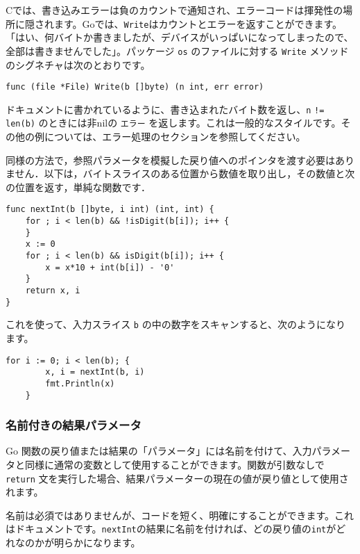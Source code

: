 \documentclass{jsarticle}
\begin{document}
Cでは、書き込みエラーは負のカウントで通知され、エラーコードは揮発性の場所に隠されます。Goでは、\texttt{Write}はカウントとエラーを返すことができます。「はい、何バイトか書きましたが、デバイスがいっぱいになってしまったので、全部は書きませんでした」。パッケージ
\texttt{os} のファイルに対する \texttt{Write}
メソッドのシグネチャは次のとおりです。

\begin{lstlisting}[numbers=none]
func (file *File) Write(b []byte) (n int, err error)
\end{lstlisting}

ドキュメントに書かれているように、書き込まれたバイト数を返し、\texttt{n}
\texttt{!=} \texttt{len(b)} のときには非nilの \texttt{エラー}
を返します。これは一般的なスタイルです。その他の例については、エラー処理のセクションを参照してください。

同様の方法で，参照パラメータを模擬した戻り値へのポインタを渡す必要はありません．以下は，バイトスライスのある位置から数値を取り出し，その数値と次の位置を返す，単純な関数です．

\begin{lstlisting}[numbers=none]
func nextInt(b []byte, i int) (int, int) {
    for ; i < len(b) && !isDigit(b[i]); i++ {
    }
    x := 0
    for ; i < len(b) && isDigit(b[i]); i++ {
        x = x*10 + int(b[i]) - '0'
    }
    return x, i
}
\end{lstlisting}

これを使って、入力スライス \texttt{b}
の中の数字をスキャンすると、次のようになります。

\begin{lstlisting}[numbers=none]
    for i := 0; i < len(b); {
        x, i = nextInt(b, i)
        fmt.Println(x)
    }
\end{lstlisting}

\subsubsection{名前付きの結果パラメータ}

Go
関数の戻り値または結果の「パラメータ」には名前を付けて、入力パラメータと同様に通常の変数として使用することができます。関数が引数なしで
\texttt{return}
文を実行した場合、結果パラメーターの現在の値が戻り値として使用されます。

名前は必須ではありませんが、コードを短く、明確にすることができます。これはドキュメントです。\texttt{nextInt}の結果に名前を付ければ、どの戻り値の\texttt{int}がどれなのかが明らかになります。
\end{document}
